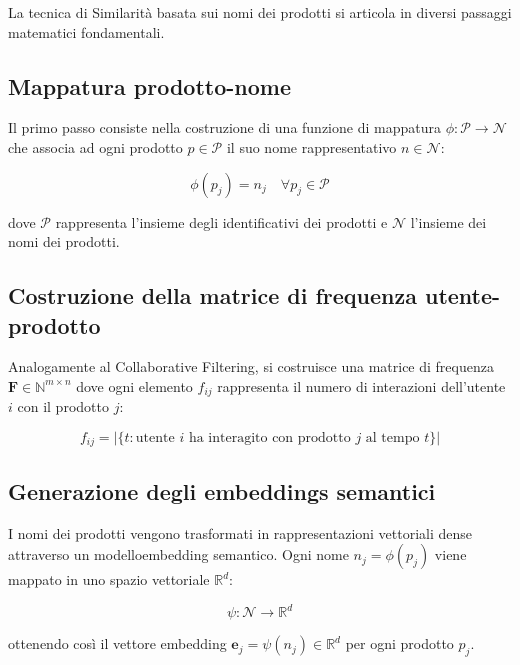 La tecnica di Similarità basata sui nomi dei prodotti si articola in diversi passaggi matematici fondamentali.

\subsection{Mappatura prodotto-nome}

Il primo passo consiste nella costruzione di una funzione di mappatura $\phi: \mathcal{P} \rightarrow \mathcal{N}$ che associa ad ogni prodotto $p \in \mathcal{P}$ il suo nome rappresentativo $n \in \mathcal{N}$:

\begin{equation}
\phi(p_j) = n_j \quad \forall p_j \in \mathcal{P}
\end{equation}

dove $\mathcal{P}$ rappresenta l'insieme degli identificativi dei prodotti e $\mathcal{N}$ l'insieme dei nomi dei prodotti.

\subsection{Costruzione della matrice di frequenza utente-prodotto}

Analogamente al Collaborative Filtering, si costruisce una matrice di frequenza $\mathbf{F} \in \mathbb{N}^{m \times n}$ dove ogni elemento $f_{ij}$ rappresenta il numero di interazioni dell'utente $i$ con il prodotto $j$:

\begin{equation}
f_{ij} = |\{t : \text{utente } i \text{ ha interagito con prodotto } j \text{ al tempo } t\}|
\end{equation}

\subsection{Generazione degli embeddings semantici}

I nomi dei prodotti vengono trasformati in rappresentazioni vettoriali dense attraverso un \gls{modelloembedding} semantico. Ogni nome $n_j = \phi(p_j)$ viene mappato in uno spazio vettoriale $\mathbb{R}^d$:

\begin{equation}
\psi: \mathcal{N} \rightarrow \mathbb{R}^d
\end{equation}

ottenendo così il vettore embedding $\mathbf{e}_j = \psi(n_j) \in \mathbb{R}^d$ per ogni prodotto $p_j$.

